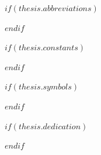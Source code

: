\begingroup
\hypersetup{linkcolor=$if(toclinkcolor)$$toclinkcolor$$else$black$endif$}

\tableofcontents %

\listoffigures %

\listoftables %

\endgroup


$if(thesis.abbreviations)$



$endif$

$if(thesis.constants)$



$endif$

$if(thesis.symbols)$



$endif$

$if(thesis.dedication)$

\dedicatory{} 

$endif$


\mainmatter %

\pagestyle{thesis} %
